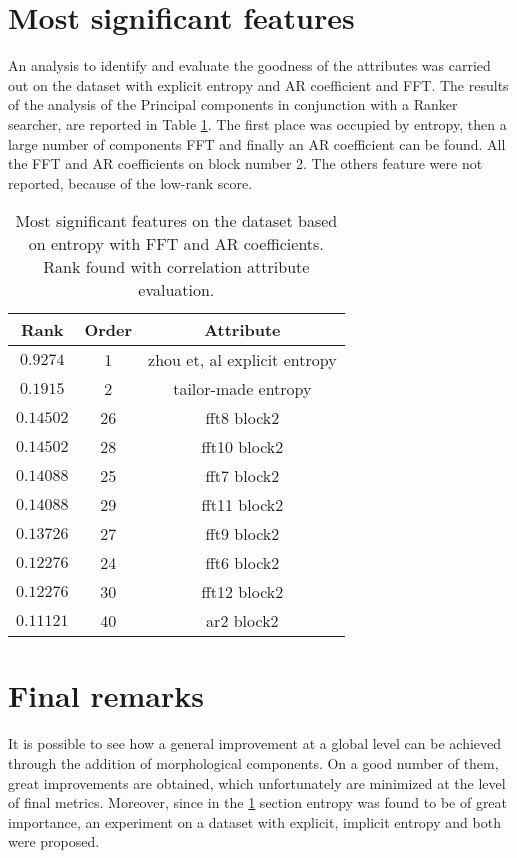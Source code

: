 \section{Most significant features}
\label{sec:significant_features}
An analysis to identify and evaluate the goodness of the attributes was carried out on the dataset with explicit entropy and AR coefficient and FFT. The results of the analysis of the Principal components in conjunction with a Ranker searcher, are reported in Table \ref{table:attributesranking}. The first place was occupied by entropy, then a large number of components FFT and finally an AR coefficient can be found. All the FFT and AR coefficients on block number 2. The others feature were not reported, because of the low-rank score.
\begin{table}[h]
\begin{center}
\begin{threeparttable}
\caption{Most significant features on the dataset based on entropy with FFT and AR coefficients. Rank found with correlation attribute evaluation.}
\label{table:attributesranking}
\scriptsize
  \begin{tabular}{c c c}
  \toprule
  \textbf{Rank} & \textbf{Order} & \textbf{Attribute} \\
  \midrule  
    $0.9274$ & 1 & zhou et, al explicit entropy \\
    $0.1915$ & 2 & tailor-made entropy \\
  $0.14502$ & 26 & fft8 block2 \\
  $0.14502$ & 28 & fft10 block2 \\
  $0.14088$ & 25 & fft7 block2 \\
  $0.14088$ & 29 & fft11 block2 \\
  $0.13726$ & 27 & fft9 block2 \\
  $0.12276$ & 24 & fft6 block2 \\
  $0.12276$ & 30 & fft12 block2 \\
  $0.11121$ & 40 & ar2 block2 \\
  \bottomrule
\end{tabular}
\end{threeparttable}
\end{center}
\end{table}


\section{Final remarks}
It is possible to see how a general improvement at a global level can be achieved through the addition of morphological components. On a good number of them, great improvements are obtained, which unfortunately are minimized at the level of final metrics. Moreover, since in the \ref{sec:significant_features} section entropy was found to be of great importance, an experiment on a dataset with explicit, implicit entropy and both were proposed.

